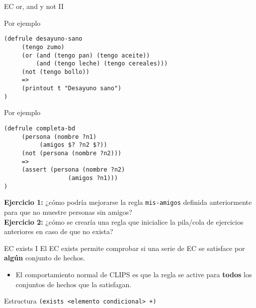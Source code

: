 \documentclass[usenames,dvipsnames,aspectratio=169]{beamer}
\begin{document}
\begin{frame}[fragile]{EC or, and y not II}
	\begin{minipage}{.48\textwidth}
		\begin{exampleblock}{Por ejemplo}
			\small
			\begin{verbatim}
(defrule desayuno-sano
     (tengo zumo)
     (or (and (tengo pan) (tengo aceite))
         (and (tengo leche) (tengo cereales)))
     (not (tengo bollo))
     =>
     (printout t "Desayuno sano")
)
			\end{verbatim}
		\end{exampleblock}
	\end{minipage}
	\hfill
	\begin{minipage}{.48\textwidth}
		\begin{exampleblock}{Por ejemplo}
			\small
			\begin{verbatim}
(defrule completa-bd
     (persona (nombre ?n1)
          (amigos $? ?n2 $?))
     (not (persona (nombre ?n2)))
     =>
     (assert (persona (nombre ?n2)
                  (amigos ?n1)))
)
			\end{verbatim}
		\end{exampleblock}
	\end{minipage}
	\textbf{Ejercicio 1:} ¿cómo podría mejorarse la regla \texttt{mis-amigos} definida anteriormente para que no muestre personas sin amigos?\\
	\textbf{Ejercicio 2:} ¿cómo se crearía una regla que inicialice la pila/cola de ejercicios anteriores en caso de que no exista?
\end{frame}

\begin{frame}{EC exists I}
	El EC exists permite comprobar si una serie de EC se satisface por \textbf{algún} conjunto de hechos.
	\begin{itemize}
		\item El comportamiento normal de CLIPS es que la regla se active para \textbf{todos} los conjuntos de hechos que la satisfagan.
	\end{itemize}
	\begin{block}{Estructura}
		\texttt{(exists <elemento condicional> +)}\\
	\end{block}
\end{frame}
\end{document}
